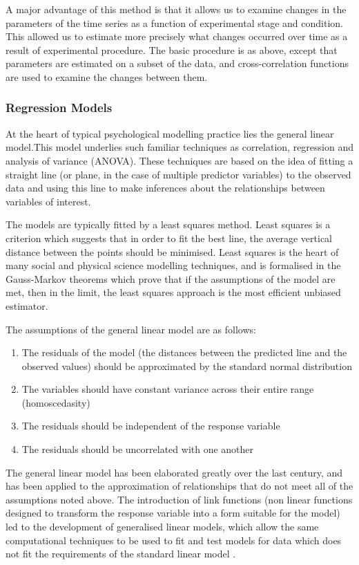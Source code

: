 A major advantage of this method is that it allows us to examine changes in the parameters of the time series as a function of experimental stage and condition. This allowed us to estimate more precisely what changes occurred over time as a result of experimental procedure. The basic procedure is as above, except that parameters are estimated on a subset of the data, and cross-correlation functions are used to examine the changes between them.


\subsubsection{Regression Models}
\label{sec:regress-models}
At the heart of typical psychological modelling practice lies the general linear model.This model underlies such familiar techniques as correlation, regression and analysis of variance (ANOVA)\cite{gelman2007data}. These techniques are based on the idea of fitting a straight line (or plane, in the case of multiple predictor variables) to the observed data and using this line to make inferences about the relationships between variables of interest.

The models are typically fitted by a least squares method. Least squares is a criterion which suggests that in order to fit the best line, the average vertical distance between the points should be minimised. Least squares is the heart of many social and physical science modelling techniques, and is formalised in the Gauss-Markov theorems which prove that if the assumptions of the model are met, then in the limit, the least squares approach is the most efficient unbiased estimator\cite{friedman2009elements}.

The assumptions of the general linear model are as follows:
\begin{enumerate}
\item The residuals of the model (the distances between the predicted line and the observed values) should be approximated by the standard normal distribution
\item The variables should have constant variance across their entire range (homoscedasity)
\item The residuals should be independent of the response variable

\item The residuals should be uncorrelated with one another
\end{enumerate}

The general linear model has been elaborated greatly over the last century, and has been applied to the approximation of relationships that do not meet all of the assumptions noted above\cite{gelman2007data}. The introduction of link functions (non linear functions designed to transform the response variable into a form suitable for the model)  led to the development of generalised linear models, which allow the same computational techniques to be used to fit and test models for data which does not fit the requirements of the standard linear model \cite{mccullagh1989generalized}.

